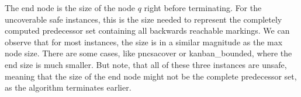 The end node is the size of the node $q$ right before terminating. For the uncoverable safe instances, this is the size needed to represent the completely computed predecessor set containing all backwards reachable markings. We can observe that for most instances, the size is in a similar magnitude as the max node size. There are some cases, like pncsacover or kanban\_bounded, where the end size is much smaller. But note, that all of these three instances are unsafe, meaning that the size of the end node might not be the complete predecessor set, as the algorithm terminates earlier. 



\begin{table}[H]
\centering
{}
\end{table}
